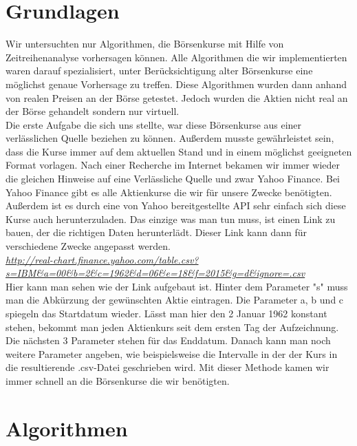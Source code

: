 \documentclass[12pt]{article} %
\begin{document}
\section{Grundlagen} %
\label{essentials}

Wir untersuchten nur Algorithmen, die Börsenkurse mit Hilfe von Zeitreihenanalyse vorhersagen können. Alle Algorithmen die wir implementierten waren darauf spezialisiert, unter Berücksichtigung alter Börsenkurse eine möglichst genaue Vorhersage zu treffen. Diese Algorithmen wurden dann anhand von realen Preisen an der Börse getestet. Jedoch wurden die Aktien nicht real an der Börse gehandelt sondern nur virtuell.
\\
Die erste Aufgabe die sich uns stellte, war diese Börsenkurse aus einer verlässlichen Quelle beziehen zu können. Außerdem musste gewährleistet sein, dass die Kurse immer auf dem aktuellen Stand und in einem möglichst geeigneten Format vorlagen. Nach einer Recherche im Internet bekamen wir immer wieder die gleichen Hinweise auf eine Verlässliche Quelle und zwar Yahoo Finance. Bei Yahoo Finance gibt es alle Aktienkurse die wir für unsere Zwecke benötigten. Außerdem ist es durch eine von Yahoo bereitgestellte API sehr einfach sich diese Kurse auch herunterzuladen. Das einzige was man tun muss, ist einen Link zu bauen, der die richtigen Daten herunterlädt. Dieser Link kann dann für verschiedene Zwecke angepasst werden.
\\ 
\textit{\url{http://real-chart.finance.yahoo.com/table.csv?s=IBM&a=00&b=2&c=1962&d=06&e=18&f=2015&g=d&ignore=.csv}}
\\
Hier kann man sehen wie der Link aufgebaut ist. Hinter dem Parameter "s" muss man die Abkürzung der gewünschten Aktie eintragen. Die Parameter a, b und c spiegeln das Startdatum wieder. Lässt man hier den 2 Januar 1962 konstant stehen, bekommt man jeden Aktienkurs seit dem ersten Tag der Aufzeichnung. Die nächsten 3 Parameter stehen für das Enddatum. Danach kann man noch weitere Parameter angeben, wie beispielsweise die Intervalle in der der Kurs in die resultierende .csv-Datei geschrieben wird. Mit dieser Methode kamen wir immer schnell an die Börsenkurse die wir benötigten.

\section{Algorithmen}
\label{algorithms}
\end{document}
